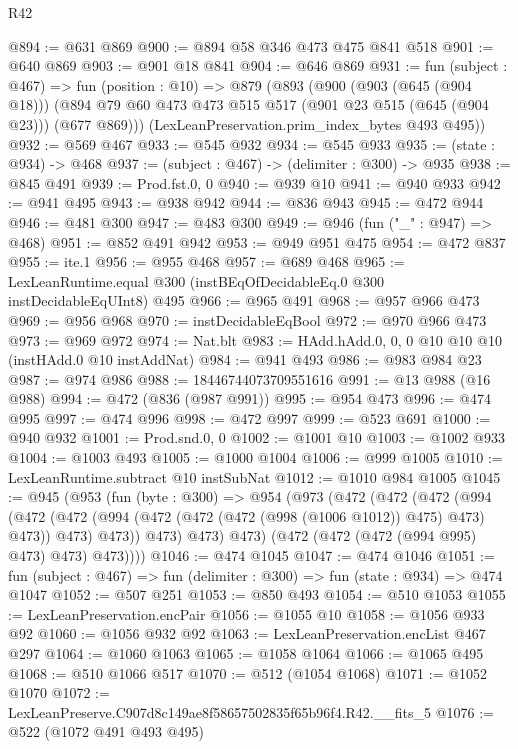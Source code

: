 \begin{lexlean}{R42}
\begin{coremodule}
@894 := @631 @869
@900 := @894 @58 @346 @473 @475 @841 @518
@901 := @640 @869
@903 := @901 @18 @841
@904 := @646 @869
@931 := fun (subject : @467) =>
  fun (position : @10) =>
  @879
    (@893
      (@900
        (@903 (@645 (@904 @18)))
        (@894 @79 @60 @473 @473 @515 @517 (@901 @23 @515 (@645 (@904 @23))) (@677 @869)))
      (LexLeanPreservation.prim_index_bytes @493 @495))
@932 := @569 @467
@933 := @545 @932
@934 := @545 @933
@935 := (state : @934) -> @468
@937 := (subject : @467) -> (delimiter : @300) -> @935
@938 := @845 @491
@939 := Prod.fst.{0, 0}
@940 := @939 @10
@941 := @940 @933
@942 := @941 @495
@943 := @938 @942
@944 := @836 @943
@945 := @472 @944
@946 := @481 @300
@947 := @483 @300
@949 := @946 (fun ("_" : @947) => @468)
@951 := @852 @491 @942
@953 := @949 @951 @475
@954 := @472 @837
@955 := ite.{1}
@956 := @955 @468
@957 := @689 @468
@965 := LexLeanRuntime.equal @300 (instBEqOfDecidableEq.{0} @300 instDecidableEqUInt8) @495
@966 := @965 @491
@968 := @957 @966 @473
@969 := @956 @968
@970 := instDecidableEqBool
@972 := @970 @966 @473
@973 := @969 @972
@974 := Nat.blt
@983 := HAdd.hAdd.{0, 0, 0} @10 @10 @10 (instHAdd.{0} @10 instAddNat)
@984 := @941 @493
@986 := @983 @984 @23
@987 := @974 @986
@988 := 18446744073709551616
@991 := @13 @988 (@16 @988)
@994 := @472 (@836 (@987 @991))
@995 := @954 @473
@996 := @474 @995
@997 := @474 @996
@998 := @472 @997
@999 := @523 @691
@1000 := @940 @932
@1001 := Prod.snd.{0, 0}
@1002 := @1001 @10
@1003 := @1002 @933
@1004 := @1003 @493
@1005 := @1000 @1004
@1006 := @999 @1005
@1010 := LexLeanRuntime.subtract @10 instSubNat
@1012 := @1010 @984 @1005
@1045 := @945
    (@953
      (fun (byte : @300) =>
      @954
        (@973
          (@472
            (@472
              (@472
                (@994
                  (@472
                    (@472 (@994 (@472 (@472 (@472 (@998 (@1006 @1012)) @475) @473) @473)) @473)
                    @473))
                @473)
              @473)
            @473)
          (@472 (@472 (@472 (@994 @995) @473) @473) @473))))
@1046 := @474 @1045
@1047 := @474 @1046
@1051 := fun (subject : @467) => fun (delimiter : @300) => fun (state : @934) => @474 @1047
@1052 := @507 @251
@1053 := @850 @493
@1054 := @510 @1053
@1055 := LexLeanPreservation.encPair
@1056 := @1055 @10
@1058 := @1056 @933 @92
@1060 := @1056 @932 @92
@1063 := LexLeanPreservation.encList @467 @297
@1064 := @1060 @1063
@1065 := @1058 @1064
@1066 := @1065 @495
@1068 := @510 @1066 @517
@1070 := @512 (@1054 @1068)
@1071 := @1052 @1070
@1072 := LexLeanPreserve.C907d8c149ae8f58657502835f65b96f4.R42.__fits_5
@1076 := @522 (@1072 @491 @493 @495)

\end{coremodule}
\end{lexlean}
